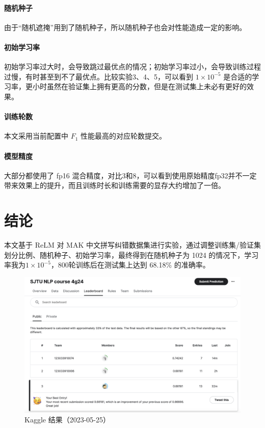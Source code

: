 \documentclass{sjtuarticle}
\begin{document}
\paragraph{随机种子}

由于“随机遮掩”用到了随机种子，所以随机种子也会对性能造成一定的影响。

\paragraph{初始学习率}

初始学习率过大时，会导致跳过最优点的情况；初始学习率过小，会导致训练过程过慢，有时甚至到不了最优点。比较实验3、4、5，可以看到 $1\times 10^{-5}$ 是合适的学习率，更小时虽然在验证集上拥有更高的分数，但是在测试集上未必有更好的效果。

\paragraph{训练轮数}

本文采用当前配置中 $F_1$ 性能最高的对应轮数提交。

\paragraph{模型精度} 大部分都使用了 fp16 混合精度，对比3和8，可以看到使用原始精度fp32并不一定带来效果上的提升，而且训练时长和训练需要的显存大约增加了一倍。

\section{结论}

本文基于 ReLM 对 MAK 中文拼写纠错数据集进行实验，通过调整训练集/验证集划分比例、随机种子、初始学习率，最终得到在随机种子为 1024 的情况下，学习率我为$1\times 10^{-5}$，800轮训练后在测试集上达到 68.18\% 的准确率。

\begin{figure}[h]
    \centering
    \includegraphics[width=\textwidth]{kaggle.png}
    \caption{Kaggle 结果（2023-05-25）}
    \label{fig:kaggle}
\end{figure}

\printbibliography[heading=bibintoc]

\appendix

\end{document}
